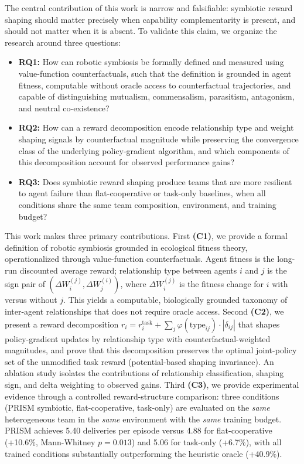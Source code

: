 \documentclass[Afour,sageh,times]{sagej}
\begin{document}
The central contribution of this work is narrow and falsifiable: symbiotic reward shaping should matter precisely when capability complementarity is present, and should not matter when it is absent. To validate this claim, we organize the research around three questions:
\begin{itemize}
    \item \textbf{RQ1:} How can robotic symbiosis be formally defined and measured using value-function counterfactuals, such that the definition is grounded in agent fitness, computable without oracle access to counterfactual trajectories, and capable of distinguishing mutualism, commensalism, parasitism, antagonism, and neutral co-existence?
    \item \textbf{RQ2:} How can a reward decomposition encode relationship type and weight shaping signals by counterfactual magnitude while preserving the convergence class of the underlying policy-gradient algorithm, and which components of this decomposition account for observed performance gains?
    \item \textbf{RQ3:} Does symbiotic reward shaping produce teams that are more resilient to agent failure than flat-cooperative or task-only baselines, when all conditions share the same team composition, environment, and training budget?
\end{itemize}

This work makes three primary contributions. First \textbf{(C1)}, we provide a formal definition of robotic symbiosis grounded in ecological fitness theory, operationalized through value-function counterfactuals. Agent fitness is the long-run discounted average reward; relationship type between agents $i$ and $j$ is the sign pair of $(\Delta W_i^{(j)}, \Delta W_j^{(i)})$, where $\Delta W_i^{(j)}$ is the fitness change for $i$ with versus without $j$. This yields a computable, biologically grounded taxonomy of inter-agent relationships that does not require oracle access. Second \textbf{(C2)}, we present a reward decomposition $r_i = r_i^{\mathrm{task}} + \sum_j \varphi(\mathrm{type}_{ij}) \cdot |\delta_{ij}|$ that shapes policy-gradient updates by relationship type with counterfactual-weighted magnitudes, and prove that this decomposition preserves the optimal joint-policy set of the unmodified task reward (potential-based shaping invariance). An ablation study isolates the contributions of relationship classification, shaping sign, and delta weighting to observed gains. Third \textbf{(C3)}, we provide experimental evidence through a controlled reward-structure comparison: three conditions (PRISM symbiotic, flat-cooperative, task-only) are evaluated on the \emph{same} heterogeneous team in the \emph{same} environment with the \emph{same} training budget. PRISM achieves 5.40 deliveries per episode versus 4.88 for flat-cooperative (+10.6\%, Mann-Whitney $p{=}0.013$) and 5.06 for task-only (+6.7\%), with all trained conditions substantially outperforming the heuristic oracle (+40.9\%).
\end{document}
